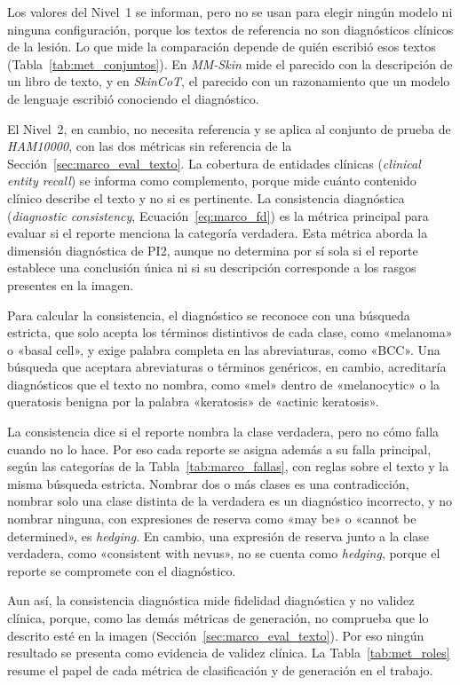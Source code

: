 Los valores del Nivel~1 se informan, pero no se usan para elegir ningún modelo ni ninguna configuración, porque los
textos de referencia no son diagnósticos clínicos de la lesión. Lo que mide la comparación depende de quién escribió
esos textos (Tabla~\ref{tab:met_conjuntos}). En \emph{MM-Skin} mide el parecido con la descripción de un libro de
texto, y en \emph{SkinCoT}, el parecido con un razonamiento que un modelo de lenguaje escribió conociendo el
diagnóstico.

El Nivel~2, en cambio, no necesita referencia y se aplica al conjunto de prueba de \emph{HAM10000}, con las dos métricas sin
referencia de la Sección~\ref{sec:marco_eval_texto}. La cobertura de entidades clínicas (\emph{clinical entity
recall}) se informa como complemento, porque mide cuánto contenido clínico describe el texto y no si es pertinente. La
consistencia diagnóstica (\emph{diagnostic consistency}, Ecuación~\ref{eq:marco_fd}) es la métrica principal para evaluar si el reporte menciona la categoría verdadera. Esta métrica aborda la dimensión diagnóstica de PI2, aunque no determina por sí sola si el reporte establece una conclusión única ni si su descripción corresponde a los rasgos presentes en la imagen.

Para calcular la consistencia, el diagnóstico se reconoce con una búsqueda estricta, que solo acepta los términos
distintivos de cada clase, como «melanoma» o «basal cell», y exige palabra completa en las abreviaturas, como «BCC».
Una búsqueda que aceptara abreviaturas o términos genéricos, en cambio, acreditaría diagnósticos que el texto no
nombra, como «mel» dentro de «melanocytic» o la queratosis benigna por la palabra «keratosis» de «actinic keratosis».

La consistencia dice si el reporte nombra la clase verdadera, pero no cómo falla cuando no lo hace. Por eso cada
reporte se asigna además a su falla principal, según las categorías de la Tabla~\ref{tab:marco_fallas}, con reglas
sobre el texto y la misma búsqueda estricta. Nombrar dos o más clases es una contradicción, nombrar solo una clase
distinta de la verdadera es un diagnóstico incorrecto, y no nombrar ninguna, con expresiones de reserva como «may be»
o «cannot be determined», es \emph{hedging}. En cambio, una expresión de reserva junto a la clase verdadera, como
«consistent with nevus», no se cuenta como \emph{hedging}, porque el reporte se compromete con el diagnóstico.

Aun así, la consistencia diagnóstica mide fidelidad diagnóstica y no validez clínica, porque, como las demás métricas
de generación, no comprueba que lo descrito esté en la imagen (Sección~\ref{sec:marco_eval_texto}). Por eso ningún
resultado se presenta como evidencia de validez clínica. La Tabla~\ref{tab:met_roles} resume el papel de cada métrica
de clasificación y de generación en el trabajo.


